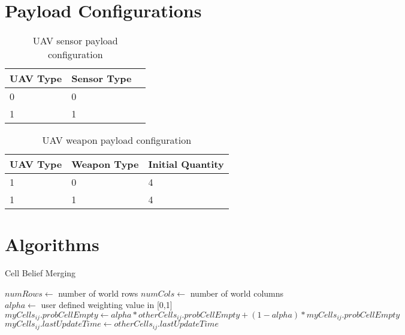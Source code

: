 

\chapter{Payload Configurations}
\label{sec:pyldConfigs}
\begin{table}[H]
	\caption{UAV sensor payload configuration}
	\centering
	\label{tab:uavSensorMap}
	\begin{tabular}{|p{1cm}|p{1cm}|p{1cm}|}
		\hline
		UAV Type & Sensor Type\\ \hline
		0 & 0 \\ \hline
		1 & 1 \\ \hline
	\end{tabular}
\end{table}

\begin{table}[H]
	\caption{UAV weapon payload configuration}
	\centering
	\label{tab:uavWpnMap}
	\begin{tabular}{|p{1cm}|p{1.5cm}|p{2cm}|}
		\hline
		UAV Type & Weapon Type & Initial Quantity\\ \hline
		1 & 0 & 4 \\ \hline
		1 & 1 & 4 \\ \hline
	\end{tabular}
\end{table}


\chapter{Algorithms}
\label{sec:algorithms}



\begin{algorithm}[H]
	\caption{Cell Belief Merging}
	\label{alg:mergeCell}
	\begin{algorithmic}[1]
		\State $numRows\gets $ number of world rows
		\State $numCols\gets $ number of world columns
		\State $alpha\gets $ user defined weighting value in [0,1]
					\State $myCells_{ij}.probCellEmpty\gets alpha * otherCells_{ij}.probCellEmpty + (1-alpha) * myCells_{ij}.probCellEmpty$
					\State $myCells_{ij}.lastUpdateTime\gets otherCells_{ij}.lastUpdateTime$
				\EndIf
			\EndFor
		\EndFor
		\EndFunction
	\end{algorithmic}
\end{algorithm}

